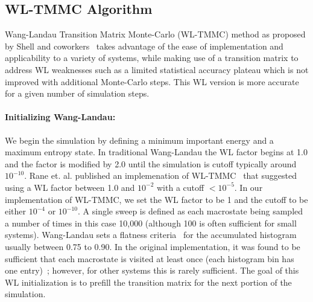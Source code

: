 \documentclass[letterpaper,twocolumn,amsmath,amssymb,pre,aps,10pt]{revtex4-1}
\begin{document}
\subsection{WL-TMMC Algorithm}

Wang-Landau Transition Matrix Monte-Carlo (WL-TMMC) method as proposed
by Shell and coworkers~\cite{shell2003improved,shell2004flat} takes
advantage of the ease of implementation and applicability to a variety
of systems, while making use of a transition matrix to address WL
weaknesses such as a limited statistical accuracy plateau which is not
improved with additional Monte-Carlo steps.  This WL version is more
accurate for a given number of simulation steps.

\paragraph{Initializing Wang-Landau:} We begin the simulation by
defining a minimum important energy and a maximum entropy state. In
traditional Wang-Landau the WL factor begins at 1.0 and the factor is
modified by 2.0 until the simulation is cutoff typically around
$10^{-10}$.  Rane et. al. published an implemenation of
WL-TMMC~\cite{rane2013monte} that suggested using a WL factor between
1.0 and $10^{-2}$ with a cutoff $<10^{-5}$. In our implementation of
WL-TMMC, we set the WL factor to be 1 and the cutoff to be either
$10^{-4}$ or $10^{-10}$. A single sweep is defined as each macrostate
being sampled a number of times in this case 10,000 (although 100 is
often sufficient for small systems). Wang-Landau sets a flatness
criteria~\cite{wang2001determining, wang2001efficient,
hatch2015computational, mahynski2017predicting} for the accumulated
histogram usually between 0.75 to 0.90.  In the original
implementation, it was found to be sufficient that each macrostate is
visited at least once (each histogram bin has one
entry)~\cite{shell2003improved}; however, for other systems this is
rarely sufficient.  The goal of this WL initialization is to prefill
the transition matrix for the next portion of the simulation.
\end{document}
